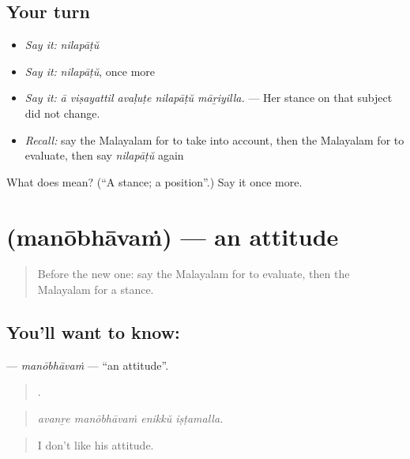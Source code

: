 \subsection*{Your turn}
\begin{itemize}
\raggedright
  \item \emph{Say it:} \emph{nilapāṭŭ}
  \item \emph{Say it:} \emph{nilapāṭŭ}, once more
  \item \emph{Say it:} \emph{ā viṣayattil avaḷuṭe nilapāṭŭ māṟiyilla.} — Her stance on that subject did not change.
  \item \emph{Recall:} say the Malayalam for to take into account, then the Malayalam for to evaluate, then say \emph{nilapāṭŭ} again
\end{itemize}

\begin{tcolorbox}[breakable,colback=teal!4,colframe=teal!35!black,title={Before you move on}]
What does  mean? (\textquotedblleft{}A stance; a position\textquotedblright{}.) Say it once more.
\end{tcolorbox}
\section[\texorpdfstring{\ml{മനോഭാവം} (manōbhāvaṁ)}{മനോഭാവം (manōbhāvaṁ)}]{ (manōbhāvaṁ) — an attitude}

\label{lesson:ML-C408-manobhavam}



\begin{quote}
Before the new one: say the Malayalam for to evaluate, then the Malayalam for a stance.
\end{quote}

\subsection*{You'll want to know: }
\textbf{} — \emph{manōbhāvaṁ} — \textquotedblleft{}an attitude\textquotedblright{}.

\begin{quote}
   .
\end{quote}

\begin{quote}
\emph{avanṟe manōbhāvaṁ enikkŭ iṣṭamalla.}
\end{quote}

\begin{quote}
I don't like his attitude.
\end{quote}

